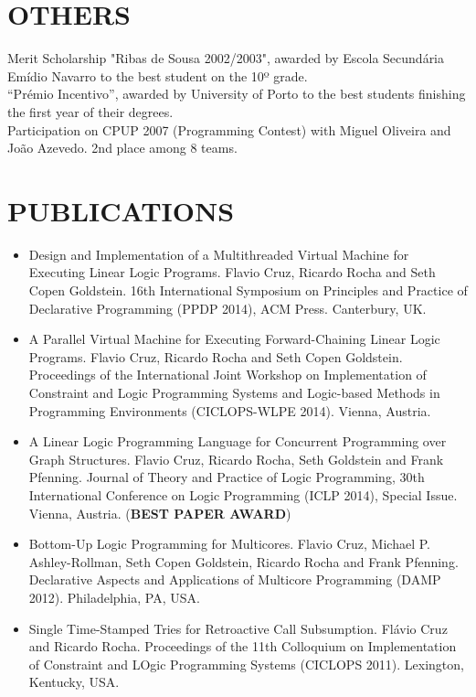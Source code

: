 \documentclass[margin]{res}
\begin{document}
\begin{resume}
\section{OTHERS} Merit Scholarship "Ribas de Sousa 2002/2003", awarded by Escola Secundária Emídio Navarro to the best student on the 10º grade. \\
                  “Prémio Incentivo”, awarded by University of Porto to the best students finishing the first year of their degrees. \\
                  Participation on CPUP 2007 (Programming Contest) with Miguel Oliveira and João Azevedo. 2nd place among 8 teams. \\
                  
\section{PUBLICATIONS}
   \begin{itemize}
      \item Design and Implementation of a Multithreaded Virtual Machine for Executing Linear Logic Programs. Flavio Cruz, Ricardo Rocha and Seth Copen Goldstein. 16th International Symposium on Principles and Practice of Declarative Programming (PPDP 2014), ACM Press. Canterbury, UK.
      \item A Parallel Virtual Machine for Executing Forward-Chaining Linear Logic Programs. Flavio Cruz, Ricardo Rocha and Seth Copen Goldstein. Proceedings of the International Joint Workshop on Implementation of Constraint and Logic Programming Systems and Logic-based Methods in Programming Environments (CICLOPS-WLPE 2014). Vienna, Austria.
      \item A Linear Logic Programming Language for Concurrent Programming over Graph Structures. Flavio Cruz, Ricardo Rocha, Seth Goldstein and Frank Pfenning. Journal of Theory and Practice of Logic Programming, 30th International Conference on Logic Programming (ICLP 2014), Special Issue. Vienna, Austria. (\textbf{BEST PAPER AWARD})
      \item Bottom-Up Logic Programming for Multicores. Flavio Cruz, Michael P. Ashley-Rollman, Seth Copen Goldstein, Ricardo Rocha and Frank Pfenning. Declarative Aspects and Applications of Multicore Programming (DAMP 2012). Philadelphia, PA, USA.
      \item Single Time-Stamped Tries for Retroactive Call Subsumption. Flávio Cruz and Ricardo Rocha. Proceedings of the 11th Colloquium on Implementation of Constraint and LOgic Programming Systems (CICLOPS 2011). Lexington, Kentucky, USA.

\end{itemize}
\end{resume}
\end{document}
